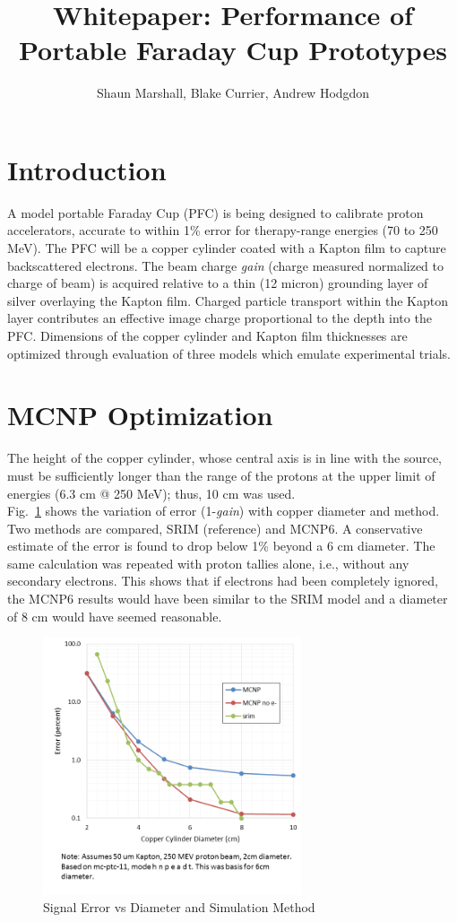 \documentclass{article}
\title{Whitepaper: Performance of Portable Faraday Cup Prototypes}
\author{Shaun Marshall, Blake Currier, Andrew Hodgdon}
\begin{document}
\maketitle

\section{Introduction}
A model portable Faraday Cup (PFC) is being designed to calibrate proton accelerators, accurate to within 1\% error for therapy-range energies (70 to 250 MeV).  The PFC will be a copper cylinder coated with a Kapton film to capture backscattered electrons.  The beam charge \emph{gain} (charge measured normalized to charge of beam) is acquired relative to a thin (12 micron) grounding layer of silver overlaying the Kapton film.  Charged particle transport within the Kapton layer contributes an effective image charge proportional to the depth into the PFC.  Dimensions of the copper cylinder and Kapton film thicknesses are optimized through evaluation of three models which emulate experimental trials.

\section{MCNP Optimization}
The height of the copper cylinder, whose central axis is in line with the source, must be sufficiently longer than the range of the protons at the upper limit of energies (6.3 cm @ 250 MeV); thus, 10 cm was used. \\

Fig.~\ref{fig:error_diameter} shows the variation of error (1-\emph{gain}) with copper diameter and method. Two methods are compared, SRIM (reference) and MCNP6. A conservative estimate of the error is found to drop below 1\% beyond a 6 cm diameter.  The same calculation was repeated with proton tallies alone, i.e., without any secondary electrons. This shows that if electrons had been completely ignored, the MCNP6 results would have been similar to the SRIM model and a diameter of 8 cm would have seemed reasonable.

\begin{figure}[H]
  \centering
  \includegraphics[width=3in]{figures/fig_error_diameter.png}
  \caption{Signal Error vs Diameter and Simulation Method} 
  \label{fig:error_diameter}
\end{figure}
\end{document}
